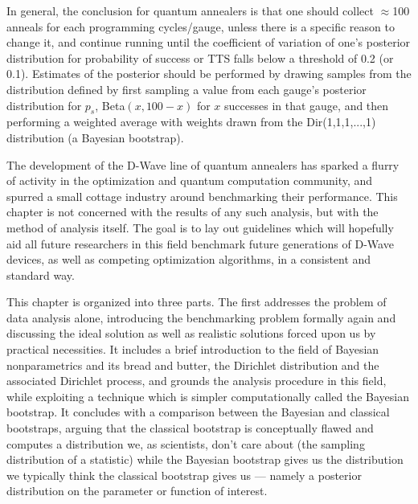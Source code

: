  In general, the conclusion for quantum annealers is that one should collect $\approx$100 anneals for each programming cycles/gauge, unless there is a specific reason to change it, and continue running until the coefficient of variation of one's posterior distribution for probability of success or TTS falls below a threshold of 0.2 (or 0.1). Estimates of the posterior should be performed by drawing samples from the distribution defined by first sampling a value from each gauge's posterior distribution for $p_s$, Beta$(x,100-x)$ for $x$ successes in that gauge, and then performing a weighted average with weights drawn from the Dir(1,1,1,...,1) distribution (a Bayesian bootstrap).



The development of the D-Wave line of quantum annealers has sparked a flurry of activity in the optimization and quantum computation community, and spurred a small cottage industry around benchmarking their performance. This chapter is not concerned with the results of any such analysis, but with the method of analysis itself. The goal is to lay out guidelines which will hopefully aid all future researchers in this field benchmark future generations of D-Wave devices, as well as competing optimization algorithms, in a consistent and standard way.

This chapter is organized into three parts. The first addresses the problem of data analysis alone, introducing the benchmarking problem formally again and discussing the ideal solution as well as realistic solutions forced upon us by practical necessities. It includes a brief introduction to the field of Bayesian nonparametrics and its bread and butter, the Dirichlet distribution and the associated Dirichlet process, and grounds the analysis procedure in this field, while exploiting a technique which is simpler computationally called the Bayesian bootstrap. It concludes with a comparison between the Bayesian and classical bootstraps, arguing that the classical bootstrap is conceptually flawed and computes a distribution we, as scientists, don't care about (the sampling distribution of a statistic) while the Bayesian bootstrap gives us the distribution we typically think the classical bootstrap gives us --- namely a posterior distribution on the parameter or function of interest.

